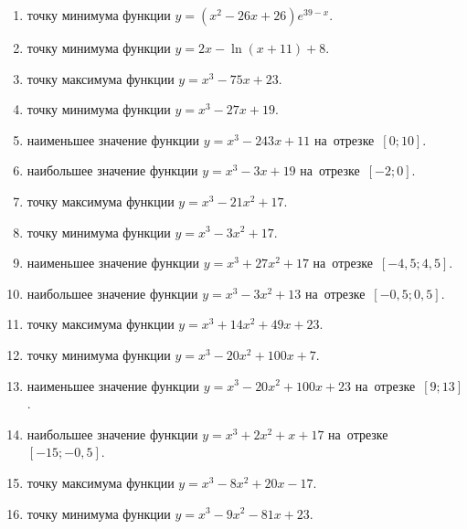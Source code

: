 \documentclass[a4paper,10pt]{article}
\begin{document}
\begin{enumerate}
\item {} точку минимума функции $y=\left(x^2-26x+26\right){{e}^{39-x}}$.

\item {} точку минимума функции $y=2x-\ln \left(x+11\right)+8$.

\item {} точку максимума функции $y=x^3 -75x +23$.

\item {} точку минимума функции $y=x^3 -27x+19$.

\item {} наименьшее значение функции $y=x^3 -243x+11$ на~отрезке~$\left[0;10\right]$.

\item {} наибольшее значение функции $y=x^3 -3x+19$ на~отрезке~$\left[-2;0\right]$.

\item {} точку максимума функции $y=x^3 -21x^2+17$.

\item {} точку минимума функции $y=x^3 -3x^2+17$.

\item {} наименьшее значение функции $y=x^3 +27x^2+17$ на~отрезке~$\left[-4,5;4,5\right]$.

\item {} наибольшее значение функции $y=x^3 -3x^2+13$ на~отрезке~$\left[-0,5;0,5\right]$.

\item {} точку максимума функции $y=x^3 +14x^2+49x+23$.

\item {} точку минимума функции $y=x^3 -20x^2+100x+7$.

\item {} наименьшее значение функции $y=x^3 -20x^2+100x+23$ на~отрезке~$\left[9;13\right]$.

\item {} наибольшее значение функции $y=x^3 +2x^2+x+17$ на~отрезке~$\left[-15;-0,5\right]$.

\item {} точку максимума функции $y=x^3 -8x^2+20x-17$.

\item {} точку минимума функции $y=x^3 -9x^2-81x+23$.


\end{enumerate}
\end{document}
